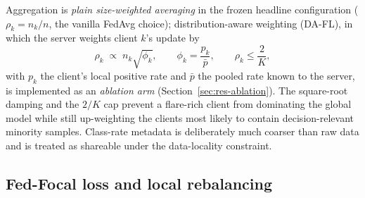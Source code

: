 Aggregation is \emph{plain size-weighted averaging} in the frozen
headline configuration ($\rho_k = n_k/n$, the vanilla FedAvg
choice); distribution-aware weighting (DA-FL), in which the server
weights client $k$'s update by
\begin{equation}\label{eq:dafl}
    \rho_k \;\propto\; n_k \sqrt{\phi_k},
    \qquad
    \phi_k = \frac{p_k}{\bar{p}},
    \qquad
    \rho_k \le \frac{2}{K},
\end{equation}
with $p_k$ the client's local positive rate and $\bar{p}$ the pooled
rate known to the server, is implemented as an \emph{ablation arm}
(Section~\ref{sec:res-ablation}). The square-root damping and the
$2/K$ cap prevent a flare-rich client from dominating the global
model while still up-weighting the clients most likely to contain
decision-relevant minority samples. Class-rate metadata is
deliberately much coarser than raw data and is treated as shareable
under the data-locality constraint.

\subsection{Fed-Focal loss and local rebalancing}

